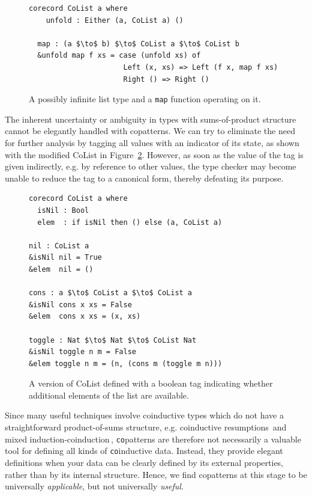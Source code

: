 \begin{figure}[h]
\begin{lstlisting}[mathescape]
  corecord CoList a where
    unfold : Either (a, CoList a) ()

  map : (a $\to$ b) $\to$ CoList a $\to$ CoList b 
  &unfold map f xs = case (unfold xs) of
                      Left (x, xs) => Left (f x, map f xs)
                      Right () => Right ()
\end{lstlisting}
  \caption{A possibly infinite list type and a \texttt{map} function operating on it.}
  \label{fig:colist}
\end{figure}

The inherent uncertainty or ambiguity in types with sums-of-product structure
cannot be elegantly handled with copatterns. We can try to eliminate the need
for further analysis by tagging all values with an indicator of its state, as
shown with the modified CoList in Figure~\ref{fig:dependent_colist}. However, as
soon as the value of the tag is given indirectly, e.g. by reference to other values,
the type checker may become unable to reduce the tag to a canonical form, thereby
defeating its purpose.

\begin{figure}[h]
\begin{lstlisting}[mathescape]
corecord CoList a where
  isNil : Bool
  elem  : if isNil then () else (a, CoList a)

nil : CoList a
&isNil nil = True
&elem  nil = ()

cons : a $\to$ CoList a $\to$ CoList a
&isNil cons x xs = False
&elem  cons x xs = (x, xs)

toggle : Nat $\to$ Nat $\to$ CoList Nat
&isNil toggle n m = False
&elem toggle n m = (n, (cons m (toggle m n)))
\end{lstlisting}
\caption{A version of CoList defined with a boolean tag indicating whether
  additional elements of the list are available.}
\label{fig:dependent_colist}
\end{figure}

Since many useful techniques involve coinductive types which do not have a
straightforward product-of-sums structure, e.g. coinductive
resumptions\,\citep{Pirog2014273} and mixed
induction-coinduction\,\citep{Danielsson09mixinginduction}, \texttt{co}patterns
are therefore not necessarily a valuable tool for defining all kinds of
\texttt{co}inductive data. Instead, they provide elegant definitions when your data can be
clearly defined by its external properties, rather than by its internal
structure. Hence, we find copatterns at this stage to be universally \emph{applicable}, but not
universally \emph{useful}.


